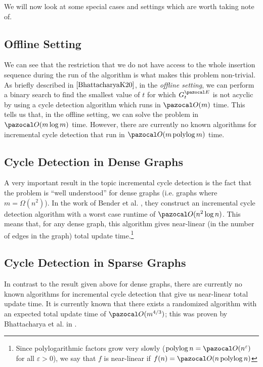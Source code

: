 \documentclass{report}
\DeclareMathOperator*{\polylog}{polylog}
\begin{document}
We will now look at some special cases and settings which are worth taking note of.

\subsection{Offline Setting}

We can see that the restriction that we do not have access to the whole insertion sequence during the run of the algorithm is what makes this problem non-trivial. As briefly described in $\cite{BhattacharyaK20}$, in the \textit{offline setting}, we can perform a binary search to find the smallest value of $t$ for which $G^{\pazocal E}_t$ is not acyclic by using a cycle detection algorithm which runs in $\pazocal O(m)$ time. This tells us that, in the offline setting, we can solve the problem in $\pazocal O(m \log m)$ time. However, there are currently no known algorithms for incremental cycle detection that run in $\pazocal O(m \polylog m)$ time.

\subsection{Cycle Detection in Dense Graphs}

A very important result in the topic incremental cycle detection is the fact that the problem is ``well understood'' for dense graphs (i.e. graphs where $m=\Omega(n^2)$). In the work of Bender et al. \cite{BenderFG09}, they construct an incremental cycle detection algorithm with a worst case runtime of $\pazocal O(n^2 \log n)$. This means that, for any dense graph, this algorithm gives near-linear (in the number of edges in the graph) total update time.\footnote{Since polylogarithmic factors grow very slowly ($\polylog n = \pazocal O (n^{\varepsilon})$ for all $\varepsilon > 0$), we say that $f$ is near-linear if $f(n) = \pazocal O(n \polylog n)$}

\subsection{Cycle Detection in Sparse Graphs}

In contrast to the result given above for dense graphs, there are currently no known algorithms for incremental cycle detection that give us near-linear total update time. It is currently known that there exists a randomized algorithm with an expected total update time of $\pazocal O(m^{4/3})$; this was proven by Bhattacharya et al. in \cite{BhattacharyaK20}.
\end{document}
